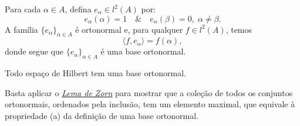 \documentclass[../functional_analysis.tex]{subfiles}
\begin{document}
  Para cada \(\alpha \in A\), defina \(e_{\alpha }\in l^{2}(A)\) por: 
    \[
      e_{\alpha }(\alpha ) =1 \quad\&\quad e_{\alpha }(\beta )=0,\; \alpha \neq \beta .
    \]
    A família \(\{e_{\alpha }\}_{\alpha \in A}\) é ortonormal e, para qualquer \(f\in l^{2}(A)\), temos 
      \[
        \langle f, e_{\alpha } \rangle = f(\alpha ),
      \]
      donde segue que \(\{e_{\alpha }\}_{\alpha \in A}\) é uma base ortonormal.
      \begin{theorem*}
        Todo espaço de Hilbert tem uma base ortonormal.
      \end{theorem*}
     \begin{proof*}
       Basta aplicar o \hyperlink{zorn_lemma}{\textit{Lema de Zorn}} para mostrar que a coleção de todos os conjuntos ortonormais, ordenados pela inclusão, tem um elemento maximal, que equivale à propriedade (a) da definição de uma base ortonormal. \qedsymbol 
     \end{proof*}
\end{document}
